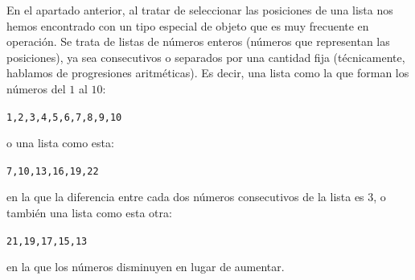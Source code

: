 \documentclass[10pt,a4paper]{article}\usepackage[]{graphicx}\usepackage[]{color}
\makeatletter
\newenvironment{kframe}{%
 \def\at@end@of@kframe{}%
 \ifinner\ifhmode%
  \def\at@end@of@kframe{\end{minipage}}%
  \begin{minipage}{\columnwidth}%
 \fi\fi%
 \def\FrameCommand##1{\hskip\@totalleftmargin \hskip-\fboxsep
 \colorbox{shadecolor}{##1}\hskip-\fboxsep
     \hskip-\linewidth \hskip-\@totalleftmargin \hskip\columnwidth}%
 \MakeFramed {\advance\hsize-\width
   \@totalleftmargin\z@ \linewidth\hsize
   \@setminipage}}%
 {\par\unskip\endMakeFramed%
 \at@end@of@kframe}
\newenvironment{knitrout}{}{} %
\newcounter {cont01}
\makeatother
\begin{document}
En el apartado anterior, al tratar de seleccionar las posiciones de una lista nos hemos encontrado con un tipo especial de objeto que es muy frecuente en operación. Se trata de listas de números enteros (números que representan las posiciones), ya sea consecutivos o separados por una cantidad fija (técnicamente, hablamos de {\sf progresiones aritméticas}). Es decir, una lista como la que forman los números del $1$ al $10$:
\begin{knitrout}
\color{fgcolor}\begin{kframe}
\begin{alltt}
1, 2, 3, 4, 5, 6, 7, 8, 9, 10
\end{alltt}
\end{kframe}
\end{knitrout}
o una lista como esta:
\begin{knitrout}
\color{fgcolor}\begin{kframe}
\begin{alltt}
7, 10, 13, 16, 19, 22
\end{alltt}
\end{kframe}
\end{knitrout}
en la que la diferencia entre cada dos números consecutivos de la lista es $3$, o también una lista como esta otra:
\begin{knitrout}
\color{fgcolor}\begin{kframe}
\begin{alltt}
21, 19, 17, 15, 13
\end{alltt}
\end{kframe}
\end{knitrout}
en la que los números disminuyen en lugar de aumentar.
\end{document}
